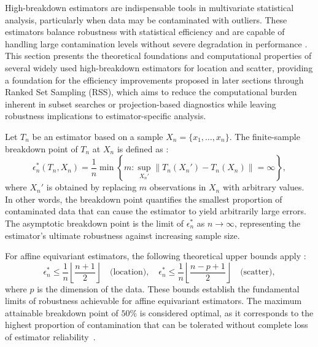 \documentclass[12pt]{article}
\begin{document}
High-breakdown estimators are indispensable tools in multivariate statistical analysis, particularly when data may be contaminated with outliers. These estimators balance robustness with statistical efficiency and are capable of handling large contamination levels without severe degradation in performance \cite{zhang2023fast}.
This section presents the theoretical foundations and computational properties of several widely used high-breakdown estimators for location and scatter, providing a foundation for the efficiency improvements proposed in later sections through Ranked Set Sampling (RSS), which aims to reduce the computational burden inherent in subset searches or projection-based diagnostics while leaving robustness implications to estimator-specific analysis.

Let $T_n$ be an estimator based on a sample $X_n = \{x_1, \ldots, x_n\}$. The finite-sample breakdown point of $T_n$
at $X_n$ is defined as \cite{rousseeuw1999fast}:
\[
\epsilon^*_n(T_n, X_n) = \frac{1}{n} \min \left\{ m : \sup_{X_n'} \| T_n(X_n') - T_n(X_n) \| = \infty \right\},
\]
where $X_n'$ is obtained by replacing $m$ observations in $X_n$ with arbitrary values. In other words, the breakdown point quantifies the smallest proportion of contaminated data that can cause the estimator to yield arbitrarily large errors. The asymptotic breakdown point is the limit of $\epsilon^*_n$ as $n \to \infty$, representing the estimator’s ultimate robustness against increasing sample size.

For affine equivariant estimators, the following theoretical upper bounds apply \cite{maronna2019robust}:
\[
\epsilon^*_n \leq \frac{1}{n} \left\lfloor \frac{n + 1}{2} \right\rfloor \quad \text{(location)}, \quad \epsilon^*_n \leq \frac{1}{n} \left\lfloor \frac{n - p + 1}{2} \right\rfloor \quad \text{(scatter)},
\]
where $p$ is the dimension of the data. These bounds establish the fundamental limits of robustness achievable for affine equivariant estimators. The maximum attainable breakdown point of $50\%$ is considered optimal, as it corresponds to the highest proportion of contamination that can be tolerated without complete loss of estimator reliability~\cite{maronna2019robust}.
\end{document}

